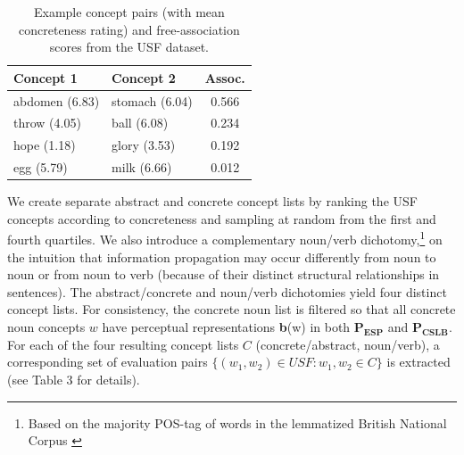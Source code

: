 \documentclass[11pt]{article}
\begin{document}
 \begin{table}[t]\begin{center}\begin{tabular}{l|l|c}



\bf Concept 1 & \bf Concept 2 & \bf Assoc. \\
 \hline 
abdomen \footnotesize{ (6.83)} & stomach \footnotesize{ (6.04)} & 0.566 \\
throw \footnotesize{  (4.05)} & ball  \footnotesize{ (6.08)} & 0.234 \\
hope \footnotesize{  (1.18)} & glory \footnotesize{ (3.53)} & 0.192 \\
egg \footnotesize{ (5.79)} & milk \footnotesize{ (6.66)} & 0.012 \\



\end{tabular}\end{center}\caption{\label{font-table} Example concept pairs (with mean concreteness rating) and free-association scores from the USF dataset.}\end{table}






We create separate abstract and concrete concept lists by ranking the USF concepts according to concreteness and sampling at random from the first and fourth quartiles. We also introduce a complementary noun/verb dichotomy,\footnote{Based on the majority POS-tag of words in the lemmatized British National Corpus \cite{leech1994claws4}} on the intuition that information propagation may occur differently from noun to noun or from noun to verb (because of their distinct structural relationships in sentences). The abstract/concrete and noun/verb dichotomies yield four distinct concept lists. For consistency, the concrete noun list is filtered so that all concrete noun concepts \(w\) have perceptual representations {\bf b}(w) in both  \(\mathbf{P_{ESP}}\) and  \(\mathbf{P_{CSLB}}\). For each of the four resulting concept lists \(C\) (concrete/abstract, noun/verb), a corresponding set of evaluation pairs  \( \{ (w_1, w_2) \in USF :  w_1, w_2 \in C\}\) is extracted (see Table 3 for details). 
\end{document}
